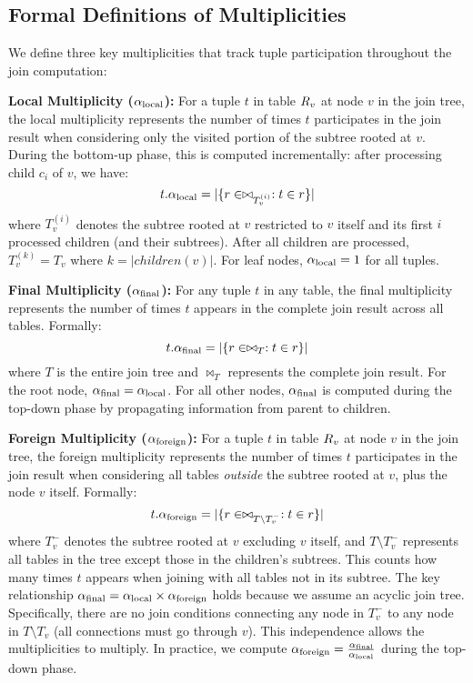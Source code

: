 \subsection{Formal Definitions of Multiplicities}

We define three key multiplicities that track tuple participation throughout the join computation:

\textbf{Local Multiplicity ($\alpha_{\text{local}}$):} For a tuple $t$ in table $R_v$ at node $v$ in the join tree, the local multiplicity represents the number of times $t$ participates in the join result when considering only the visited portion of the subtree rooted at $v$. During the bottom-up phase, this is computed incrementally: after processing child $c_i$ of $v$, we have:
$$t.\alpha_{\text{local}} = |\{r \in \bowtie_{T_v^{(i)}} : t \in r\}|$$
where $T_v^{(i)}$ denotes the subtree rooted at $v$ restricted to $v$ itself and its first $i$ processed children (and their subtrees). After all children are processed, $T_v^{(k)} = T_v$ where $k = |children(v)|$. For leaf nodes, $\alpha_{\text{local}} = 1$ for all tuples.

\textbf{Final Multiplicity ($\alpha_{\text{final}}$):} For any tuple $t$ in any table, the final multiplicity represents the number of times $t$ appears in the complete join result across all tables. Formally:
$$t.\alpha_{\text{final}} = |\{r \in \bowtie_{T} : t \in r\}|$$
where $T$ is the entire join tree and $\bowtie_{T}$ represents the complete join result. For the root node, $\alpha_{\text{final}} = \alpha_{\text{local}}$. For all other nodes, $\alpha_{\text{final}}$ is computed during the top-down phase by propagating information from parent to children.

\textbf{Foreign Multiplicity ($\alpha_{\text{foreign}}$):} For a tuple $t$ in table $R_v$ at node $v$ in the join tree, the foreign multiplicity represents the number of times $t$ participates in the join result when considering all tables \emph{outside} the subtree rooted at $v$, plus the node $v$ itself. Formally:
$$t.\alpha_{\text{foreign}} = |\{r \in \bowtie_{T \setminus T_v^{-}} : t \in r\}|$$
where $T_v^{-}$ denotes the subtree rooted at $v$ excluding $v$ itself, and $T \setminus T_v^{-}$ represents all tables in the tree except those in the children's subtrees. This counts how many times $t$ appears when joining with all tables not in its subtree. The key relationship $\alpha_{\text{final}} = \alpha_{\text{local}} \times \alpha_{\text{foreign}}$ holds because we assume an acyclic join tree. Specifically, there are no join conditions connecting any node in $T_v^{-}$ to any node in $T \setminus T_v$ (all connections must go through $v$). This independence allows the multiplicities to multiply. In practice, we compute $\alpha_{\text{foreign}} = \frac{\alpha_{\text{final}}}{\alpha_{\text{local}}}$ during the top-down phase.


